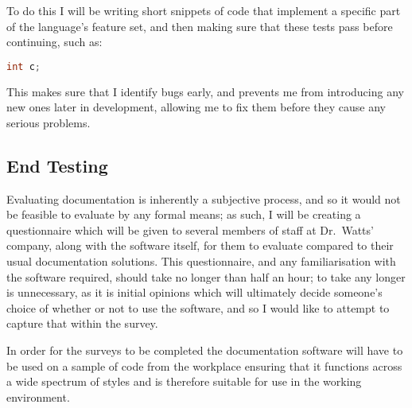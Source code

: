     To do this I will be writing short snippets of code that implement a
    specific part of the language's feature set, and then making sure that these
    tests pass before continuing, such as:

    \begin{lstlisting}[language=c, gobble=4]
      int c;
    \end{lstlisting}

    This makes sure that I identify bugs early, and prevents me from introducing
    any new ones later in development, allowing me to fix them before they cause
    any serious problems.

  \subsection{End Testing}
    Evaluating documentation is inherently a subjective process, and so it would
    not be feasible to evaluate by any formal means; as such, I will be creating
    a questionnaire which will be given to several members of staff at
    Dr.~Watts' company, along with the software itself, for them to evaluate
    compared to their usual documentation solutions. This questionnaire, and any
    familiarisation with the software required, should take no longer than half
    an hour; to take any longer is unnecessary, as it is initial opinions which
    will ultimately decide someone's choice of whether or not to use the
    software, and so I would like to attempt to capture that within the survey.

    In order for the surveys to be completed the documentation software will
    have to be used on a sample of code from the workplace ensuring that it
    functions across a wide spectrum of styles and is therefore suitable for use
    in the working environment.
